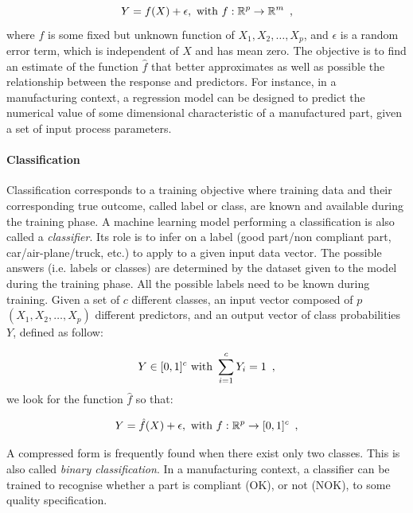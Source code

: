 \begin{equation}
  Y=f(X) + \epsilon, \textnormal{ with } f:\mathbb{R}^{p} \rightarrow \mathbb{R}^{m}
  \enspace,
\end{equation}
where $f$ is some fixed but unknown function of $X_1,X_2,\ldots,X_p$, and $\epsilon$ is a random error term, which is independent of $X$ and has mean zero. The objective is to find an estimate of the function $\hat{f}$ that better approximates as well as possible the relationship between the response and predictors. For instance, in a manufacturing context, a regression model can be designed to predict the numerical value of some dimensional characteristic of a manufactured part, given a set of input process parameters.

\paragraph{Classification} \label{Classification}

Classification corresponds to a training objective where training data and their corresponding true outcome, called label or class, are known and available during the training phase. A machine learning model performing a classification is also called a \textit{classifier}. Its role is to infer on a label (good part/non compliant part, car/air-plane/truck, etc.) to apply to a given input data vector. The possible answers (i.e. labels or classes) are determined by the dataset given to the model during the training phase. All the possible labels need to be known during training. Given a set of $c$ different classes, an input vector composed of $p$ $(X_1,X_2,\ldots,X_p)$ different predictors, and an output vector of class probabilities $Y$, defined as follow:

\begin{equation}
    Y \in [0, 1]^{c} \textnormal{ with } \sum_{i=1}^{c} Y_{i} = 1
    \enspace,
\end{equation}
we look for the function $\hat{f}$ so that:

\begin{equation}
  Y=\hat{f}(X)+ \epsilon, \textnormal{ with } f:\mathbb{R}^{p} \rightarrow [0,1]^{c}
  \enspace,
\end{equation}

A compressed form is frequently found when there exist only two classes. This is also called \textit{binary classification}. In a manufacturing context, a classifier can be trained to recognise whether a part is compliant (OK), or not (NOK), to some quality specification.   

